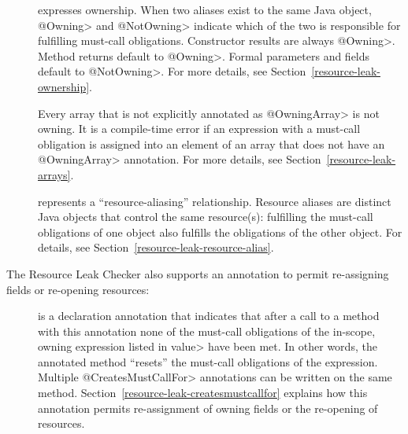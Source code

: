 \begin{description}

\item[]
\item[]
  expresses ownership.  When two aliases exist to the same Java object,
  \<@Owning> and \<@NotOwning> indicate which of the two is responsible for
  fulfilling must-call obligations.
  Constructor results are always \<@Owning>. Method returns default to
  \<@Owning>.  Formal parameters and fields default to \<@NotOwning>.
  For more details, see Section~\ref{resource-leak-ownership}.
\item[]
  Every array that is not explicitly annotated as \<@OwningArray> is not owning. It is a compile-time error if an expression with a must-call obligation is assigned into an element of an array that does not have an \<@OwningArray> annotation. For more details, see Section~\ref{resource-leak-arrays}.

\item[]
  represents a ``resource-aliasing'' relationship.  Resource aliases are
  distinct Java objects that control the same resource(s):
  fulfilling the must-call obligations of one object also
  fulfills the obligations of the other object.  For details,
  see Section~\ref{resource-leak-resource-alias}.

\end{description}

The Resource Leak Checker also supports an annotation to permit re-assigning
fields or re-opening resources:

\begin{description}

\item[]
  is a declaration annotation that indicates that after a call to a method
  with this annotation none of the must-call obligations of the in-scope, owning expression
  listed in \<value> have been met.
  In other words, the annotated method ``resets'' the must-call obligations of the expression.
  Multiple \<@CreatesMustCallFor>
  annotations can be written on the same method.  Section~\ref{resource-leak-createsmustcallfor}
  explains how this annotation permits re-assignment of owning
  fields or the re-opening of resources.

\end{description}



